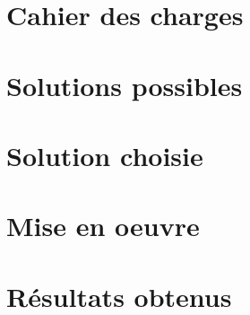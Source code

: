 
\section{Cahier des charges}


\section{Solutions possibles}


\section{Solution choisie}


\section{Mise en oeuvre}


\section{Résultats obtenus}


